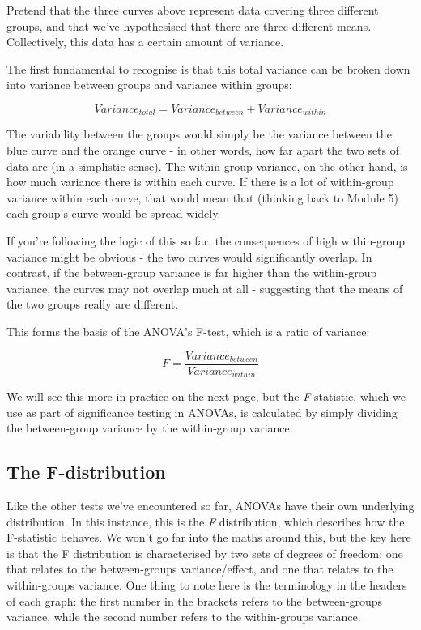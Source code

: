 \documentclass[
]{book}
\begin{document}
Pretend that the three curves above represent data covering three
different groups, and that we've hypothesised that there are three
different means. Collectively, this data has a certain amount of
variance.

The first fundamental to recognise is that this total variance can be
broken down into variance between groups and variance within groups:

\[
Variance_{total} = Variance_{between} + Variance_{within}
\]

The variability between the groups would simply be the variance between
the blue curve and the orange curve - in other words, how far apart the
two sets of data are (in a simplistic sense). The within-group variance,
on the other hand, is how much variance there is within each curve. If
there is a lot of within-group variance within each curve, that would
mean that (thinking back to Module 5) each group's curve would be spread
widely.

If you're following the logic of this so far, the consequences of high
within-group variance might be obvious - the two curves would
significantly overlap. In contrast, if the between-group variance is far
higher than the within-group variance, the curves may not overlap much
at all - suggesting that the means of the two groups really are
different.

This forms the basis of the ANOVA's F-test, which is a ratio of
variance:

\[
F = \frac{Variance_{between}}{Variance_{within}}
\]

We will see this more in practice on the next page, but the
\emph{F}-statistic, which we use as part of significance testing in ANOVAs, is
calculated by simply dividing the between-group variance by the
within-group variance.

\subsection{The F-distribution}\label{the-f-distribution}

Like the other tests we've encountered so far, ANOVAs have their own
underlying distribution. In this instance, this is the \emph{F} distribution,
which describes how the F-statistic behaves. We won't go far into the
maths around this, but the key here is that the F distribution is
characterised by two sets of degrees of freedom: one that relates to the
between-groups variance/effect, and one that relates to the
within-groups variance. One thing to note here is the terminology in the
headers of each graph: the first number in the brackets refers to the
between-groups variance, while the second number refers to the
within-groups variance.
\end{document}
